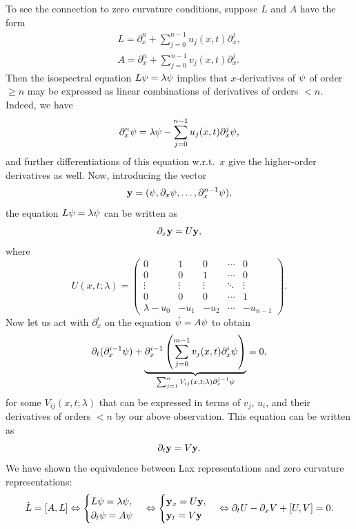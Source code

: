 \begin{example}
    To see the connection to zero curvature conditions, suppose $L$ and $A$ have the form 
    \begin{align}
        L=\partial_x^n+\sum_{j=0}^{n-1}u_j(x,t)\partial_x^j,\\
        A=\partial_x^n+\sum_{j=0}^{n-1}v_j(x,t)\partial_x^j.
    \end{align}
    Then the isospectral equation $L\bf{\psi}=\lambda\bf{\psi}$ implies that $x$-derivatives of $\bf{\psi}$ of order $\geq n$ may be expressed as linear combinations of derivatives of orders $<n$. Indeed, we have
    \[\partial_x^n\bf{\psi}=\lambda\bf{\psi}-\sum_{j=0}^{n-1}u_j(x,t)\partial_x^j\bf{\psi},\]
    and further differentiations of this equation w.r.t.\ $x$ give the higher-order derivatives as well. Now, introducing the vector 
    \[\bf{y}=(\bf{\psi},\partial_x\bf{\psi},\ldots,\partial_x^{n-1}\bf{\psi}),\]
    the equation $L\bf{\psi}=\lambda\bf{\psi}$ can be written as 
    \[\partial_x\bf{y}=U\bf{y},\]
    where 
    \[U(x,t;\lambda)=
    \begin{pmatrix}
        0 & 1 & 0 & \cdots & 0\\
        0 & 0 & 1 & \cdots & 0\\
        \vdots & \vdots & \vdots & \ddots & \vdots \\
        0 & 0 & 0 & \cdots & 1\\
        \lambda-u_0 & -u_1 & -u_2 & \cdots & -u_{n-1}
    \end{pmatrix}.
    \]
    Now let us act with $\partial_x^i$ on the equation $\dot{\bf{\psi}}=A\bf{\psi}$ to obtain 
    \[\partial_t(\partial_x^{i-1}\bf{\psi})+\underbrace{\partial_x^{i-1}\left(\sum_{j=0}^{m-1}v_j(x,t)\partial_x^i\bf{\psi}\right)}_{\sum_{j=1}^nV_{ij}(x,t;\lambda)\partial_x^{j-1}\bf{\psi}}=0,\]
    for some $V_{ij}(x,t;\lambda)$ that can be expressed in terms of $v_j$, $u_i$, and their derivatives of orders $<n$ by our above observation. This equation can be written as 
    \[\partial_t \bf{y}=V\bf{y}.\]
    We have shown the equivalence between Lax representations and zero curvature representations:
    \[
    \dot L=[A,L]\Leftrightarrow 
    \begin{cases}
        L\bf{\psi}=\lambda\bf{\psi},\\
        \partial_t\bf{\psi}=A\bf{\psi}
    \end{cases}\Leftrightarrow
    \begin{cases}
        \bf{y}_x=U\bf{y},\\
        \bf{y}_t=V\bf{y}
    \end{cases}\Leftrightarrow
    \partial_t U-\partial_x V+[U,V]=0.
    \]
\end{example}

